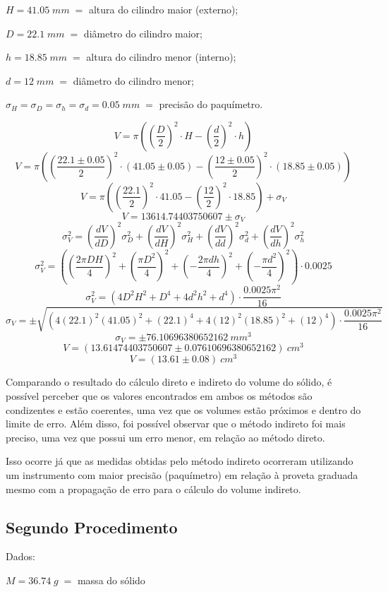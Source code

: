 \documentclass{article}
\begin{document}
$H = 41.05\;mm\;=$ altura do cilindro maior (externo);

$D = 22.1\;mm\;=$ diâmetro do cilindro maior;

$h = 18.85\;mm\;=$ altura do cilindro menor (interno);

$d = 12\;mm\;=$ diâmetro do cilindro menor;

$\sigma_H = \sigma_D = \sigma_h = \sigma_d = 0.05\;mm\;=$ precisão do paquímetro.

\[V = \pi \left(\left(\frac{D}{2}\right)^2\cdot H-\left(\frac{d}{2}\right)^2\cdot h\right)\]
\[V = \pi \left(\left(\frac{22.1\pm0.05}{2}\right)^2\cdot \left(41.05\pm0.05\right)-\left(\frac{12\pm0.05}{2}\right)^2\cdot \left(18.85\pm0.05\right)\right)\]
\[V = \pi \left(\left(\frac{22.1}{2}\right)^2\cdot 41.05-\left(\frac{12}{2}\right)^2\cdot 18.85\right)+\sigma_V\]
\[V = 13614.74403750607\pm\sigma_V\]
\vline
\[\sigma_V^2=\left(\frac{dV}{dD}\right)^2\sigma_D^2+\left(\frac{dV}{dH}\right)^2\sigma_H^2+\left(\frac{dV}{dd}\right)^2\sigma_d^2+\left(\frac{dV}{dh}\right)^2\sigma_h^2\]
\[\sigma_V^2=\left(\left(\frac{2\pi DH}{4}\right)^2+\left(\frac{\pi D^2}{4}\right)^2+\left(-\frac{2\pi dh}{4}\right)^2+\left(-\frac{\pi d^2}{4}\right)^2\right)\cdot0.0025\]
\[\sigma_V^2=\left(4D^2H^2+D^4+4d^2h^2+d^4\right)\cdot\frac{0.0025\pi^2}{16}\]
\[\sigma_V=\pm\sqrt{\left(4\left(22.1\right)^2\left(41.05\right)^2+\left(22.1\right)^4+4\left(12\right)^2\left(18.85\right)^2+\left(12\right)^4\right)\cdot\frac{0.0025\pi^2}{16}}\]
\[\sigma_V=\pm76.10696380652162\:mm^3\]
\[V = (13.61474403750607\pm0.07610696380652162)\:cm^3\]
\[V = (13.61\pm0.08)\:cm^3\]

Comparando o resultado do cálculo direto e indireto do volume do sólido, é possível perceber que os valores encontrados em ambos os métodos são condizentes e estão coerentes, uma vez que os volumes estão próximos e dentro do limite de erro. Além disso, foi possível observar que o método indireto foi mais preciso, uma vez que possui um erro menor, em relação ao método direto.

Isso ocorre já que as medidas obtidas pelo método indireto ocorreram utilizando um instrumento com maior precisão (paquímetro) em relação à proveta graduada mesmo com a propagação de erro para o cálculo do volume indireto.


\subsection{Segundo Procedimento}
Dados:

$M = 36.74\;g\; = $ massa do sólido
\end{document}
